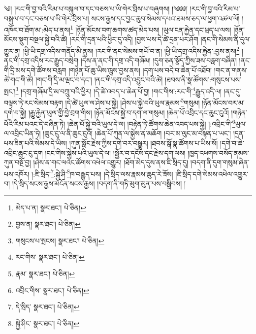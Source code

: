 \setcounter{footnote}{0} 
༄། །རང་གི་བྱ་བའི་རིམ་པ་བསྐུལ་བ་དང་བཅས་པ་ཡི་གེར་བྲིས་པ་བཞུགས། །༄༅༅། །རང་གི་བྱ་བའི་རིམ་པ་བསྐུལ་བ་དང་བཅས་པ་ཡི་གེར་བྲིས་པ། སངས་རྒྱས་དང་བྱང་ཆུབ་སེམས་དཔའ་ཐམས་ཅད་ལ་ཕྱག་འཚལ་ལོ། །འཁོར་བ་ཐོག་མ་:མེད་པ་ནས།\footnote{མེད་པ་ན།  སྣར་ཐང་།  པེ་ཅིན། } །ཉོན་མོངས་བག་ཆགས་ཚད་མེད་པས། །ཡུལ་ངན་རྐྱེན་དང་ཕྲད་པ་ལས། །ཉོན་མོངས་སྡུག་བསྔལ་སྐྱེ་བའི་ཚེ། །རང་གི་དྲན་པའི་ཕྱིར་དུ་འདི། །བྱས་པས་དེ་ཚེ་དྲན་པར་ཤོག །ནང་གི་སེམས་ནི་དུལ་གྱུར་ན། །ཕྱི་ཡི་དགྲ་འདིས་གནོད་མི་ནུས། །རང་གི་ནང་སེམས་གཡོ་བ་ན། །ཕྱི་ཡི་དགྲ་འདིས་རྐྱེན་:བྱས་ནས།\footnote{བྱས་ན།  སྣར་ཐང་།  པེ་ཅིན། } །ནང་གི་དགྲ་འདིས་རང་རྒྱུད་བསྲེག །དེས་ན་ནང་གི་དགྲ་འདི་གཞོམ། །དུག་ཅན་སྣོད་ཀྱིས་ཟས་བརླག་བཞིན། །ནང་གི་དྲི་མས་དགེ་ཚོགས་བརླག །གཉེན་པོ་ཆུ་ཡིས་ཁྲུས་བྱས་ནས། །དག་པས་བདེ་བ་ཆེན་པོ་འཐོབ། །གང་ན་གནས་ཚེ་གང་གི་ཚེ། །གང་གི་དྲི་མ་ལྡང་བ་དང་། །ནང་གི་དགྲ་འདི་འབྱུང་བའི་ཚེ། །ཐབས་ནི་སྣ་ཚོགས་:གསུངས་པས་སྤང་།\footnote{གསུངས་པ་སྤངས།  སྣར་ཐང་།  པེ་ཅིན། } །དགྲ་གཞོམ་དྲི་མ་བཀྲུ་བའི་ཕྱིར། །དེ་ཚེ་འབད་པ་ཆེན་པོ་བྱ། །གང་གིས་:རང་གི་\footnote{རང་གིས་  སྣར་ཐང་།  པེ་ཅིན། }རྒྱུད་འདི་ལ། །ནང་དུ་བལྟས་ཏེ་རང་སེམས་བརྟག །དེ་ཚེ་ཡུལ་ལ་ཤེས་པ་སྐྱེ། །ཤེས་པ་སྐྱེ་བའི་ཡུལ་རྣམས་\footnote{རྣམ་  སྣར་ཐང་།  པེ་ཅིན། }གསུམ། །ཉོན་མོངས་བར་མ་དགེ་བ་སྐྱེ། །རྒྱུ་རྐྱེན་ཡུལ་གྱི་བྱེ་བྲག་གིས། །ཉོན་མོངས་སྐྱེ་བ་དག་ལ་གསུམ། །ཆེན་པོ་འབྲིང་དང་ཆུང་ངུའོ། །གཉེན་པོའི་རིམ་པའང་དེ་བཞིན་ཏེ། །ཆེན་པོ་སྐྱེ་བའི་ཡུལ་དེ་ལ། །བརྟེན་ཏེ་ཚོགས་ཆེན་འབད་པས་སྐྱེ། །:འབྲིང་གི་\footnote{འབྲིང་གིས་  སྣར་ཐང་།  པེ་ཅིན། }ཡུལ་ལ་འབྲིང་ཡིན་ཏེ། །ཆུང་ངུ་ལ་ནི་ཆུང་ངུའོ། །ཆེན་པོ་ཀུན་ལ་སྐྱེས་ན་མཆོག །བར་མ་ལུང་མ་བསྟན་པ་ཡང་། །དྲན་པས་ཟིན་པའི་སེམས་དེ་ཡིས། །ཀུན་སློང་རྗེས་ཀྱིས་དགེ་བར་བསྒྱུར། །ཐབས་སྒོ་སྣ་ཚོགས་པ་ཡིས་སོ། །དགེ་བ་ཆེ་འབྲིང་ཆུང་ངུ་དག །ངང་གིས་སྐྱེས་པའི་ཡུལ་དེ་ལ། །སྦྱོར་བ་དངོས་དང་རྗེས་དག་ལས། །ཁྱད་འཕགས་བསོད་ནམས་ཀུན་བསྔོ་བྱ། །ཤེས་ན་གང་ལའང་ཚོགས་འཕེལ་འགྱུར། །ཐོག་མེད་དུས་ནས་ཇི་སྲིད་དུ། །བདག་ནི་དུག་གསུམ་ཞེན་པས་འཁོར། །:ཇི་སྲིད་\footnote{དེ་སྲིད་  སྣར་ཐང་།  པེ་ཅིན། }:སྐྱེ་ཤི་\footnote{སྐྱེ་ཤིང་  སྣར་ཐང་།  པེ་ཅིན། }ཁ་བརྒྱུད་པས། །དེ་སྲིད་ལས་རྣམས་ཆུད་རེ་ཟོས། །ཇི་སྲིད་དགེ་སེམས་འཕེལ་འགྱུར་བ། །དེ་སྲིད་སངས་རྒྱས་མངོན་སངས་རྒྱས། །བདག་ནི་གཏི་མུག་མུན་པས་བསྒྲིབས། །
